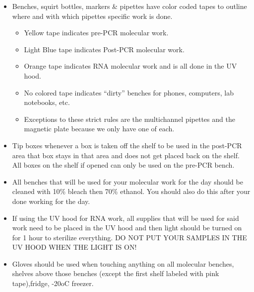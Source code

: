 \documentclass[
  letterpaper,
  DIV=11,
  numbers=noendperiod]{scrreprt}
\begin{document}
\begin{itemize}
\item
  Benches, squirt bottles, markers \& pipettes have color coded tapes to
  outline where and with which pipettes specific work is done.

  \begin{itemize}
  \item
    Yellow tape indicates pre-PCR molecular work.
  \item
    Light Blue tape indicates Post-PCR molecular work.
  \item
    Orange tape indicates RNA molecular work and is all done in the UV
    hood.
  \item
    No colored tape indicates ``dirty'' benches for phones, computers,
    lab notebooks, etc.
  \item
    Exceptions to these strict rules are the multichannel pipettes and
    the magnetic plate because we only have one of each.
  \end{itemize}
\item
  Tip boxes whenever a box is taken off the shelf to be used in the
  post-PCR area that box stays in that area and does not get placed back
  on the shelf. All boxes on the shelf if opened can only be used on the
  pre-PCR bench.
\item
  All benches that will be used for your molecular work for the day
  should be cleaned with 10\% bleach then 70\% ethanol. You should also
  do this after your done working for the day.
\item
  If using the UV hood for RNA work, all supplies that will be used for
  said work need to be placed in the UV hood and then light should be
  turned on for 1 hour to sterilize everything. DO NOT PUT YOUR SAMPLES
  IN THE UV HOOD WHEN THE LIGHT IS ON!
\item
  Gloves should be used when touching anything on all molecular benches,
  shelves above those benches (except the first shelf labeled with pink
  tape),fridge, -20oC freezer.


\end{itemize}
\end{document}
